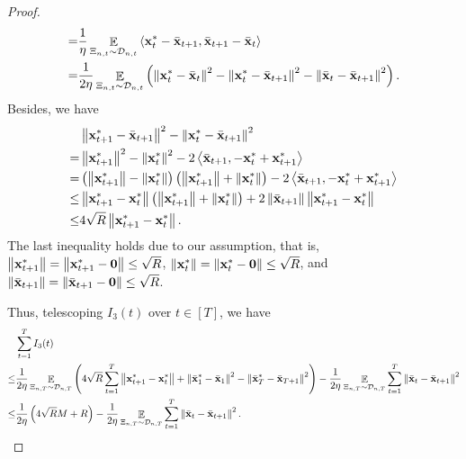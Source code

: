 \documentclass{article}
\begin{document}
\begin{proof}
\begin{align}
= & \frac{1}{\eta}\mathop{\mathbb{E}}_{ \Xi_{n,t} \sim \mathcal{D}_{n,t} }\left\langle {\bf x}_t^\ast - \bar{{\bf x}}_{t+1}, \bar{{\bf x}}_{t+1} - \bar{{\bf x}}_t  \right\rangle \\ \label{equa_I3_temp}
= & \frac{1}{2\eta}\mathop{\mathbb{E}}_{ \Xi_{n,t} \sim \mathcal{D}_{n,t} }\left(  \left\lVert{\bf x}_t^\ast - \bar{{\bf x}}_t\right\rVert^2 - \left\lVert{\bf x}_t^\ast - \bar{{\bf x}}_{t+1}\right\rVert^2 - \left\lVert\bar{{\bf x}}_t - \bar{{\bf x}}_{t+1}\right\rVert^2  \right). 
\end{align} Besides, we have
\begin{align}
\nonumber
& \left\lVert{\bf x}_{t+1}^\ast - \bar{{\bf x}}_{t+1}\right\rVert^2 - \left\lVert{\bf x}_t^\ast - \bar{{\bf x}}_{t+1}\right\rVert^2 \\ \nonumber 
= & \left\lVert{\bf x}_{t+1}^\ast\right\rVert^2 - \left\lVert{\bf x}_t^\ast\right\rVert^2 - 2\left\langle\bar{{\bf x}}_{t+1}, -{\bf x}_t^\ast + {\bf x}_{t+1}^\ast \right\rangle \\ \nonumber
= & \left( \left\lVert{\bf x}_{t+1}^\ast\right\rVert - \left\lVert{\bf x}_t^\ast\right\rVert \right) \left( \left\lVert{\bf x}_{t+1}^\ast\right\rVert + \left\lVert{\bf x}_t^\ast\right\rVert \right) - 2\left\langle\bar{{\bf x}}_{t+1}, -{\bf x}_t^\ast + {\bf x}_{t+1}^\ast \right\rangle \\ \nonumber
\le & \left\lVert{\bf x}_{t+1}^\ast - {\bf x}_t^\ast\right\rVert \left( \left\lVert{\bf x}_{t+1}^\ast\right\rVert + \left\lVert{\bf x}_t^\ast\right\rVert \right) + 2\left\lVert\bar{{\bf x}}_{t+1}\right\rVert \left\lVert{\bf x}_{t+1}^\ast-{\bf x}_t^\ast\right\rVert \\ \nonumber
\le & 4\sqrt{R}\left\lVert{\bf x}_{t+1}^\ast - {\bf x}_t^\ast\right\rVert.   
\end{align} The last inequality holds due to our assumption, that is, $\left\lVert{\bf x}_{t+1}^\ast\right\rVert=\left\lVert{\bf x}_{t+1}^\ast - {\bf 0}\right\rVert\le \sqrt{R}$, $\left\lVert{\bf x}_t^\ast\right\rVert = \left\lVert{\bf x}_t^\ast-{\bf 0}\right\rVert \le \sqrt{R}$, and $\left\lVert\bar{{\bf x}}_{t+1}\right\rVert = \left\lVert\bar{{\bf x}}_{t+1}-{\bf 0}\right\rVert \le \sqrt{R}$. 

Thus, telescoping $I_3(t)$ over $t\in[T]$, we have 
\begin{align}
\nonumber
& \sum_{t=1}^T I_3(t) \\ \nonumber 
\le & \frac{1}{2\eta}\mathop{\mathbb{E}}_{ \Xi_{n,T} \sim \mathcal{D}_{n,T} }\left(  4\sqrt{R}\sum_{t=1}^T\left\lVert{\bf x}_{t+1}^\ast - {\bf x}_t^\ast\right\rVert + \left\lVert\bar{{\bf x}}_1^\ast - \bar{{\bf x}}_1\right\rVert^2 - \left\lVert\bar{{\bf x}}_T^\ast - \bar{{\bf x}}_{T+1}\right\rVert^2  \right) - \frac{1}{2\eta} \mathop{\mathbb{E}}_{ \Xi_{n,T} \sim \mathcal{D}_{n,T} }\sum_{t=1}^T \left\lVert\bar{{\bf x}}_t - \bar{{\bf x}}_{t+1}\right\rVert^2 \\ \nonumber
\le & \frac{1}{2\eta}\left(  4\sqrt{R} M + R  \right) - \frac{1}{2\eta} \mathop{\mathbb{E}}_{ \Xi_{n,T} \sim \mathcal{D}_{n,T} } \sum_{t=1}^T \left\lVert\bar{{\bf x}}_t - \bar{{\bf x}}_{t+1} \right\rVert^2.
\end{align} 



\end{proof}
\end{document}
